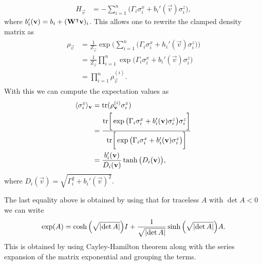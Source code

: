 \begin{align}
    H_\vec{v}
        &= -\sum_{i=1}^{n} \big(\Gamma_i \sigma_i^x + b_i'(\vec{v}) \sigma_i^z\big),
\end{align}
where \( b_i'(\mathbf{v}) = b_i + (\mathbf{W}^\intercal\mathbf{v})_i \).
This allows one to rewrite the clamped density matrix as
\begin{align}
\begin{split}
    \rho_\vec{v}
        &= \frac{1}{Z_\vec{v}} \exp\bigg( \sum_{i=1}^{n} \big(\Gamma_i \sigma_i^x + h_i'(\vec{v}) \sigma_i^z\big) \bigg) \\
        &= \frac{1}{Z_\vec{v}} \prod_{i=1}^{n} \exp \big(\Gamma_i \sigma_i^x + b_i'(\vec{v}) \sigma_i^z\big) \\
        &= \prod_{i=1}^{n} \rho_\vec{v}^{(i)}.
\end{split}
\end{align}
With this we can compute the expectation values as
\begin{align}
\begin{split}
    \langle \sigma_i^z \rangle_{\mathbf{v}}
        &= \text{tr}(\rho_{\mathbf{v}}^{(i)}\sigma_i^z) \\
        &= \frac{\text{tr}\bigg[ \exp \big(\Gamma_i \sigma_i^x + b_i'(\mathbf{v}) \sigma_i^z\big) \sigma_i^z \bigg]}{\text{tr}\bigg[ \exp \big(\Gamma_i \sigma_i^x + b_i'(\mathbf{v}) \sigma_i^z\big) \bigg]} \\
        &= \frac{b_i'(\mathbf{v})}{D_i(\mathbf{v})} \tanh\big(D_i(\mathbf{v})\big),
\end{split}
\end{align}
where \( D_i(\vec{v}) = \sqrt{\Gamma_i^2 + b_i'(\vec{v})^2} \).

The last equality above is obtained by using that for traceless \( A \) with \( \det A < 0 \) we can write
\begin{align}
    \exp(A) = \cosh\Big(\sqrt{\lvert\det A\rvert}\Big) I + \frac{1}{\sqrt{\lvert\det A\rvert}}\sinh\Big(\sqrt{\lvert\det A\rvert}\Big) A.
\end{align}
This is obtained by using Cayley-Hamilton theorem along with the series expansion of the matrix exponential and grouping the terms.

